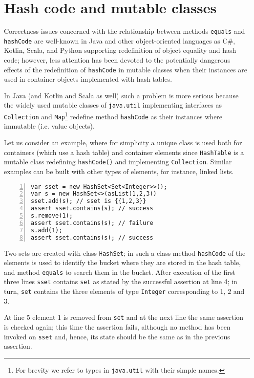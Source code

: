 \section{Hash code and mutable classes}\label{sec:example}

Correctness issues concerned with the relationship between methods \lstinline{equals} and \lstinline{hashCode} are well-known
in Java \cite{Bloch18,OkanoHSON19} and other object-oriented languages as C\#, Kotlin, Scala, and Python supporting redefinition
of object equality and hash code; however, less attention has been devoted to the potentially dangerous effects of the redefinition of 
\lstinline{hashCode} in mutable classes when their instances are used in container objects implemented with hash tables.

In Java (and Kotlin and Scala as well)  such a problem is more serious because the widely used mutable classes of \lstinline{java.util}
implementing interfaces as \lstinline{Collection} and \lstinline{Map}\footnote{For brevity we refer to types in \lstinline{java.util} with their simple names.}  redefine method \lstinline{hashCode} as their instances where immutable (i.e. value objects).

Let us consider an example, where for simplicity a unique class is used both for containers (which use a hash table) and container elements
since \lstinline{HashTable} is a mutable class redefining \lstinline{hashCode()} and implementing \lstinline{Collection}.
Similar examples can be built with other types of elements, for instance, linked lists.
\begin{lstlisting}[numbers=left]
var sset = new HashSet<Set<Integer>>();
var s = new HashSet<>(asList(1,2,3))
sset.add(s); // sset is {{1,2,3}}
assert sset.contains(s); // success
s.remove(1);
assert sset.contains(s); // failure
s.add(1);
assert sset.contains(s); // success
\end{lstlisting}
Two sets are created with class \lstinline{HashSet}; in such a class method \lstinline{hashCode} of the elements is used to identify the
bucket where they are stored in the hash table, and method \lstinline{equals} to search them in the bucket.
After execution of the first three lines \lstinline{sset} contains \lstinline{set} as stated by the successful assertion at line 4; in turn, \lstinline{set}
contains the three elements of type \lstinline{Integer} corresponding to 1, 2 and 3.

At line 5 element 1 is removed from \lstinline{set} and at the next line the same assertion is checked again; this time the assertion fails, although no method has been invoked on \lstinline{sset} and, hence, its state should be the same as in the previous assertion.

